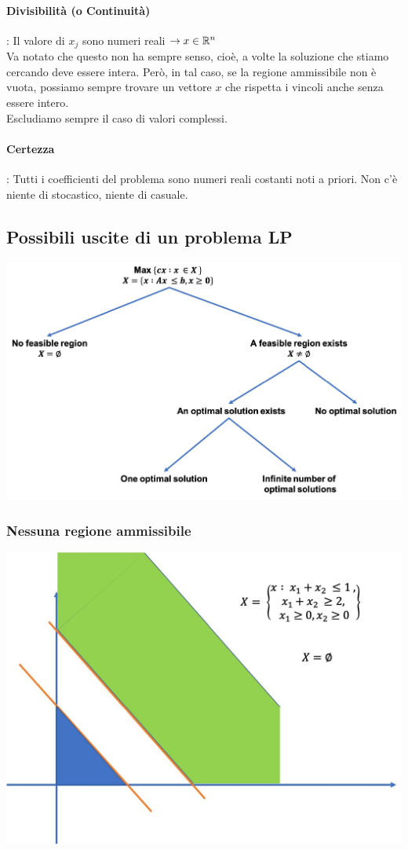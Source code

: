 \documentclass[12pt,a4paper]{article}
\begin{document}
\paragraph{Divisibilità (o Continuità)}: Il valore di $x_j$ sono numeri reali $\rightarrow x\in \mathbb{R}^n$\\
Va notato che questo non ha sempre senso, cioè, a volte la soluzione che stiamo cercando deve essere intera. Però, in tal caso, se la regione ammissibile non è vuota, possiamo sempre trovare un vettore $x$ che rispetta i vincoli anche senza essere intero.\\
Escludiamo sempre il caso di valori complessi.

\paragraph{Certezza}: Tutti i coefficienti del problema sono numeri reali costanti noti a priori. Non c'è niente di stocastico, niente di casuale.

\subsection{Possibili uscite di un problema LP}
\begin{center}
\includegraphics[width=0.8\columnwidth]{img/lp_solutions.jpg}
\end{center}
\subsubsection{Nessuna regione ammissibile}
\begin{center}
\includegraphics[width=0.4\columnwidth]{img/no_region.jpg}
\end{center}
\end{document}
